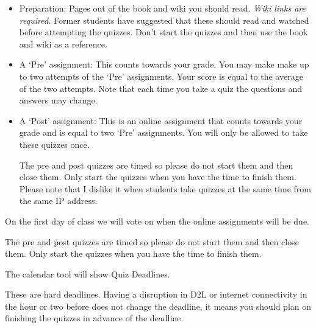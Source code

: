 \documentclass[letterpaper,10pt]{article}
\begin{document}
\begin{itemize}
\item Preparation: Pages out of the book and wiki you should read.
  \emph{Wiki links are required.}  Former students have suggested that these should read and watched before attempting the quizzes.  Don't start the quizzes and then use the book and wiki as a reference.
  
\item A `Pre' assignment: This counts towards your grade.
  You may make make up to two attempts of the `Pre' assignments.
  Your score is equal
  to the average of the two attempts. Note that each time you take a quiz the questions and answers may change.

\item A `Post' assignment: This is an online assignment that counts
  towards your grade and is equal to two `Pre' assignments.  You will
  only be allowed to take these quizzes once.

  The pre and post quizzes are timed so please do not start them and
  then close them.  Only start the quizzes when you have the time to
  finish them.  Please note that I dislike it when students take
  quizzes at the same time from the same IP address.

\end{itemize}


On the first day of class we will vote on when the online assignments will be due.  

The pre and post quizzes are timed so please do not start them and
then close them.  Only start the quizzes when you have the time to
finish them.   


The calendar tool will show Quiz Deadlines. 
  
These are hard deadlines.  Having a disruption in D2L or internet connectivity in the hour or two before does not change the deadline, it means you should plan on finishing the quizzes in advance of the deadline.
\end{document}
